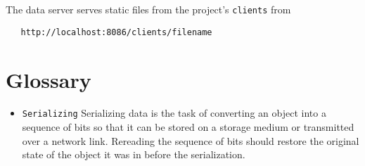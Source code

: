 \documentclass[a4paper,10pt]{book}
\begin{document}
The data server serves static files from the project's \texttt{clients} from

\begin{verbatim}
   http://localhost:8086/clients/filename
\end{verbatim}



\chapter{Glossary}

\begin{itemize}
\item \texttt{Serializing}
Serializing data is the task of converting an object into a sequence of
bits so that it can be stored on a storage medium or transmitted over a
network link. Rereading the sequence of bits should restore the original
state of the object it was in before the serialization.
\end{itemize}
\end{document}
